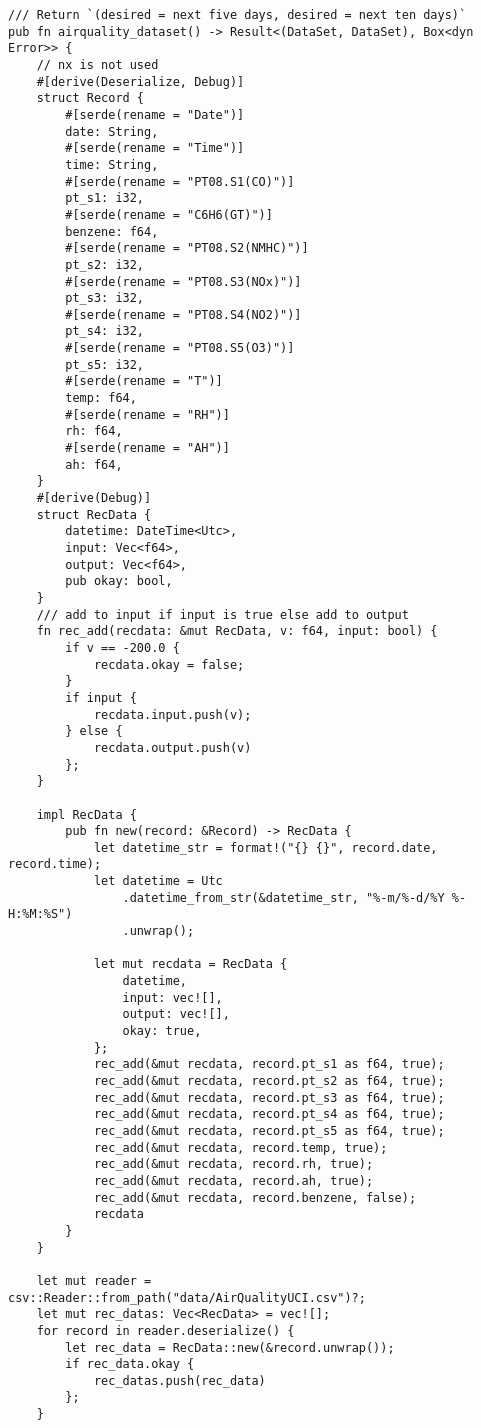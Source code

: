 \begin{code}
\begin{verbatim}
/// Return `(desired = next five days, desired = next ten days)`
pub fn airquality_dataset() -> Result<(DataSet, DataSet), Box<dyn Error>> {
    // nx is not used
    #[derive(Deserialize, Debug)]
    struct Record {
        #[serde(rename = "Date")]
        date: String,
        #[serde(rename = "Time")]
        time: String,
        #[serde(rename = "PT08.S1(CO)")]
        pt_s1: i32,
        #[serde(rename = "C6H6(GT)")]
        benzene: f64,
        #[serde(rename = "PT08.S2(NMHC)")]
        pt_s2: i32,
        #[serde(rename = "PT08.S3(NOx)")]
        pt_s3: i32,
        #[serde(rename = "PT08.S4(NO2)")]
        pt_s4: i32,
        #[serde(rename = "PT08.S5(O3)")]
        pt_s5: i32,
        #[serde(rename = "T")]
        temp: f64,
        #[serde(rename = "RH")]
        rh: f64,
        #[serde(rename = "AH")]
        ah: f64,
    }
    #[derive(Debug)]
    struct RecData {
        datetime: DateTime<Utc>,
        input: Vec<f64>,
        output: Vec<f64>,
        pub okay: bool,
    }
    /// add to input if input is true else add to output
    fn rec_add(recdata: &mut RecData, v: f64, input: bool) {
        if v == -200.0 {
            recdata.okay = false;
        }
        if input {
            recdata.input.push(v);
        } else {
            recdata.output.push(v)
        };
    }

    impl RecData {
        pub fn new(record: &Record) -> RecData {
            let datetime_str = format!("{} {}", record.date, record.time);
            let datetime = Utc
                .datetime_from_str(&datetime_str, "%-m/%-d/%Y %-H:%M:%S")
                .unwrap();

            let mut recdata = RecData {
                datetime,
                input: vec![],
                output: vec![],
                okay: true,
            };
            rec_add(&mut recdata, record.pt_s1 as f64, true);
            rec_add(&mut recdata, record.pt_s2 as f64, true);
            rec_add(&mut recdata, record.pt_s3 as f64, true);
            rec_add(&mut recdata, record.pt_s4 as f64, true);
            rec_add(&mut recdata, record.pt_s5 as f64, true);
            rec_add(&mut recdata, record.temp, true);
            rec_add(&mut recdata, record.rh, true);
            rec_add(&mut recdata, record.ah, true);
            rec_add(&mut recdata, record.benzene, false);
            recdata
        }
    }

    let mut reader = csv::Reader::from_path("data/AirQualityUCI.csv")?;
    let mut rec_datas: Vec<RecData> = vec![];
    for record in reader.deserialize() {
        let rec_data = RecData::new(&record.unwrap());
        if rec_data.okay {
            rec_datas.push(rec_data)
        };
    }


\end{verbatim}
\end{code}
